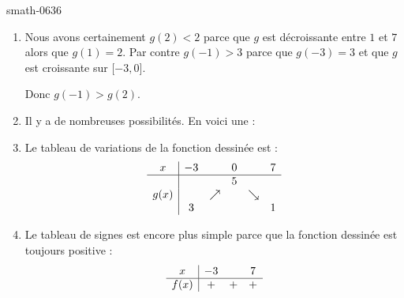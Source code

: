 
\begin{corrige}{smath-0636}

    \begin{enumerate}
        \item
            Nous avons certainement \( g(2)<2\) parce que \( g\) est décroissante entre \( 1\) et \( 7\) alors que \( g(1)=2\). Par contre \( g(-1)>3\) parce que \( g(-3)=3\) et que \( g\) est croissante sur \( \mathopen[ -3 , 0 \mathclose]\).

            Donc \( g(-1)>g(2)\).
        \item
            Il y a de nombreuses possibilités. En voici une :
            \begin{center}
                
            \end{center}
        \item
            Le tableau de variations de la fonction dessinée est :
            \begin{equation*}
                \begin{array}[]{c|ccccc}
                    x&-3&&0&&7\\
                    \hline
                    &&&5&&\\
                    g(x)&&\nearrow&&\searrow&\\
                    &3&&&&1\\
                \end{array}
            \end{equation*}

        \item
            Le tableau de signes est encore plus simple parce que la fonction dessinée est toujours positive :
            \begin{equation*}
                \begin{array}[]{c|ccc}
                     x&-3&&7\\
                      \hline
                      f(x)&+&+&+\\ 
                       \end{array}
                   \end{equation*}

    \end{enumerate}
    

\end{corrige}
